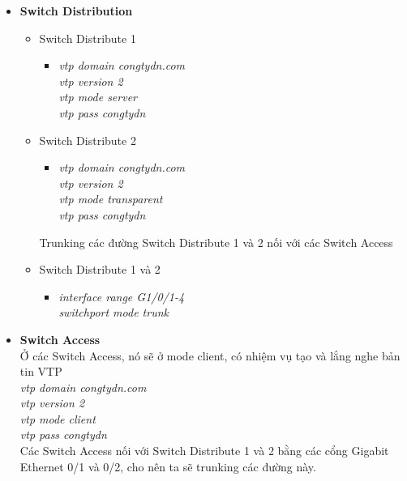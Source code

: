 \documentclass[12pt,a4paper]{report}
\begin{document}
\begin{itemize}
  \item \textbf{Switch Distribution}
    \begin{itemize}
    \item Switch Distribute 1
    \begin{itemize}
      \item \textit{vtp domain congtydn.com \\
vtp version 2\\
vtp mode server\\
vtp pass congtydn\\}
    \end{itemize}
    \item Switch Distribute 2
     \begin{itemize}
      \item \textit{vtp domain congtydn.com\\
vtp version 2\\
vtp mode transparent\\
vtp pass congtydn\\
}  
    \end{itemize}
    \hspace*{1cm} Trunking các đường  Switch Distribute 1 và 2 nối với các Switch Access  \\
     \item Switch Distribute 1 và 2
     \begin{itemize}
      \item \textit{interface range G1/0/1-4\\
                    switchport mode trunk}   
    \end{itemize}
   \end{itemize}
  \item \textbf{Switch Access}\\
\hspace*{1cm} Ở các Switch Access, nó sẽ ở mode client, có nhiệm vụ tạo và lắng nghe bản tin VTP\\
\hspace*{2cm}\textit{vtp domain congtydn.com \\
\hspace*{2cm}vtp version 2\\
\hspace*{2cm}vtp mode client\\
\hspace*{2cm}vtp pass congtydn\\} 
\hspace*{1cm}Các Switch Access nối với Switch Distribute 1 và 2 bằng các cổng Gigabit Ethernet 0/1 và 0/2, cho nên ta sẽ trunking các đường này.\\

\end{itemize}
\end{document}

